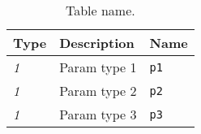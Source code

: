 \begin{table}[htbp]
\centering
\begin{tabular}{lll}
\hline
\textbf{Type} & \textbf{Description} & \textbf{Name} \\ \hline
\textit{1} & Param type 1 & \texttt{p1} \\ \hline
\textit{1} & Param type 2 & \texttt{p2} \\ \hline
\textit{1} & Param type 3 & \texttt{p3} \\ \hline
\end{tabular}
\caption{Table name.}
\label{tab:param}
\end{table}
